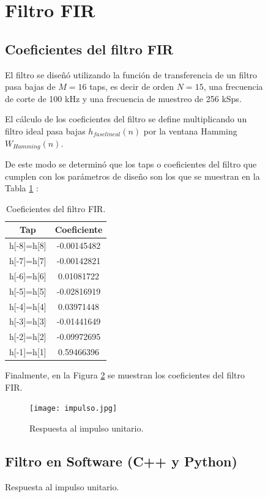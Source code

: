 \documentclass[12pt]{difu100cia} %
\begin{document}
\begin{figure}[!ht]
\section{Filtro FIR}
\label{filtrofir}

\subsection{Coeficientes del filtro FIR}

El filtro se diseñó utilizando la función de transferencia de un filtro pasa bajas de $M=16$ taps, es decir de orden $N=15$, una frecuencia de corte de 100 kHz y una frecuencia de muestreo de 256 kSps. 

El cálculo de los coeficientes del filtro se define multiplicando un filtro ideal pasa bajas $h_{fase lineal}(n)$ por la ventana Hamming $W_{Hamming}(n)$. 

De este modo se determinó que los taps o coeficientes del filtro que cumplen con los parámetros de diseño son los que se muestran en la Tabla \ref{coeficientes} : 

\begin{table}[htb!]
\centering
\caption{Coeficientes del filtro FIR.} 
\begin{tabular}{cc} 
\toprule
 Tap   & Coeficiente \\ 
 \midrule
 h[-8]=h[8] & -0.00145482 \\ 
 h[-7]=h[7] & -0.00142821 \\ 
 h[-6]=h[6] & 0.01081722 \\ 
 h[-5]=h[5] & -0.02816919 \\ 
 h[-4]=h[4] & 0.03971448 \\ 
 h[-3]=h[3] & -0.01441649 \\ 
 h[-2]=h[2] & -0.09972695 \\
 h[-1]=h[1] & 0.59466396 \\
\bottomrule
\end{tabular}
\label{coeficientes}
\end{table}

Finalmente, en la Figura \ref{imp_unita} se muestran los coeficientes del filtro FIR.

\begin{figure}[!th]
	\centering
	\texttt{[image: impulso.jpg]}
	\caption{Respuesta al impulso unitario.}
	\label{imp_unita}
\end{figure}

\subsection{Filtro en Software (C++ y Python)}


\end{figure}
\end{document}
